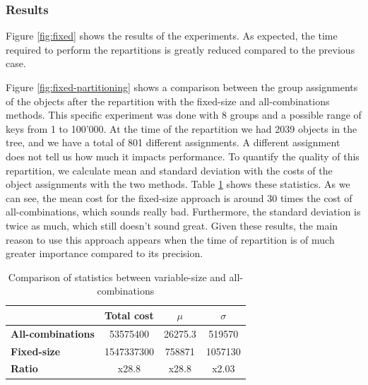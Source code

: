 \subsubsection{Results}
Figure \ref{fig:fixed} shows the results of the experiments. As expected, the time required to perform the repartitions is greatly reduced compared to the previous case. 

Figure \ref{fig:fixed-partitioning} shows a comparison between the group assignments of the objects after the repartition with the fixed-size and all-combinations methods. This specific experiment was done with 8 groups and a possible range of keys from 1 to 100'000. At the time of the repartition we had 2039 objects in the tree, and we have a total of 801 different assignments. A different assignment does not tell us how much it impacts performance.
To quantify the quality of this repartition, we calculate mean and standard deviation with the costs of the object assignments with the two methods. Table \ref{tab:mean-stddev-fixed-all} shows these statistics. As we can see, the mean cost for the fixed-size approach is around 30 times the cost of all-combinations, which sounds really bad. Furthermore, the standard deviation is twice as much, which still doesn't sound great. Given these results, the main reason to use this approach appears when the time of repartition is of much greater importance compared to its precision.

\begin{table}[!htb]
  \centering
  \begin{tabular}{l c c c}
    \hline
    & \textbf{Total cost} & \textbf{$\mu$} & \textbf{$\sigma$} \\
    \hline
    \textbf{All-combinations} & 53575400 & 26275.3 & 519570\\
    \textbf{Fixed-size} & 1547337300 & 758871 & 1057130 \\
    \hline
    \textbf{Ratio} & x28.8 & x28.8 & x2.03 \\
    \hline
  \end{tabular}
  \caption{Comparison of statistics between variable-size and all-combinations}\label{tab:mean-stddev-fixed-all}
\end{table}


